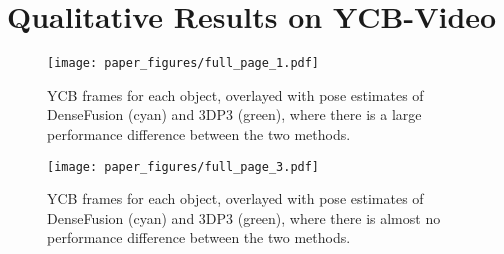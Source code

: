 \section{Qualitative Results on YCB-Video}

\begin{figure}[hp!]
	\centering
	\texttt{[image: paper\_figures/full\_page\_1.pdf]}
	\caption{YCB frames for each object, overlayed with pose estimates of DenseFusion (cyan) and 3DP3 (green), where there is a large performance difference between the two methods.}
	\label{fig:ycb_full_page_1}
\end{figure}



\begin{figure}[hp!]
	\centering
	\texttt{[image: paper\_figures/full\_page\_3.pdf]}
	\caption{YCB frames for each object, overlayed with pose estimates of DenseFusion (cyan) and 3DP3 (green), where there is almost no performance difference between the two methods.}
	\label{fig:ycb_full_page_3}
\end{figure}


\newpage


